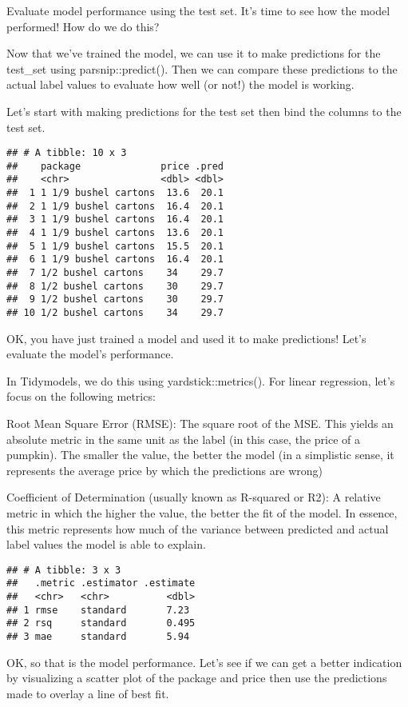 \documentclass[
]{article}
\begin{document}
Evaluate model performance using the test set. It's time to see how the
model performed! How do we do this?

Now that we've trained the model, we can use it to make predictions for
the test\_set using parsnip::predict(). Then we can compare these
predictions to the actual label values to evaluate how well (or not!)
the model is working.

Let's start with making predictions for the test set then bind the
columns to the test set.

\begin{verbatim}
## # A tibble: 10 x 3
##    package              price .pred
##    <chr>                <dbl> <dbl>
##  1 1 1/9 bushel cartons  13.6  20.1
##  2 1 1/9 bushel cartons  16.4  20.1
##  3 1 1/9 bushel cartons  16.4  20.1
##  4 1 1/9 bushel cartons  13.6  20.1
##  5 1 1/9 bushel cartons  15.5  20.1
##  6 1 1/9 bushel cartons  16.4  20.1
##  7 1/2 bushel cartons    34    29.7
##  8 1/2 bushel cartons    30    29.7
##  9 1/2 bushel cartons    30    29.7
## 10 1/2 bushel cartons    34    29.7
\end{verbatim}

OK, you have just trained a model and used it to make predictions! Let's
evaluate the model's performance.

In Tidymodels, we do this using yardstick::metrics(). For linear
regression, let's focus on the following metrics:

Root Mean Square Error (RMSE): The square root of the MSE. This yields
an absolute metric in the same unit as the label (in this case, the
price of a pumpkin). The smaller the value, the better the model (in a
simplistic sense, it represents the average price by which the
predictions are wrong)

Coefficient of Determination (usually known as R-squared or R2): A
relative metric in which the higher the value, the better the fit of the
model. In essence, this metric represents how much of the variance
between predicted and actual label values the model is able to explain.

\begin{verbatim}
## # A tibble: 3 x 3
##   .metric .estimator .estimate
##   <chr>   <chr>          <dbl>
## 1 rmse    standard       7.23 
## 2 rsq     standard       0.495
## 3 mae     standard       5.94
\end{verbatim}

OK, so that is the model performance. Let's see if we can get a better
indication by visualizing a scatter plot of the package and price then
use the predictions made to overlay a line of best fit.
\end{document}
